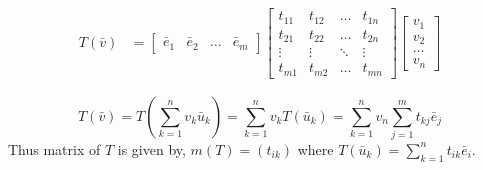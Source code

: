\begin{commentary}
\begin{align*}
	T(\bar{v}) & = \begin{bmatrix} \bar{e}_1 & \bar{e}_2 & \dots & \bar{e}_m \end{bmatrix} \begin{bmatrix} t_{11} & t_{12} & \dots & t_{1n} \\ t_{21} & t_{22} & \dots & t_{2n} \\ \vdots & \vdots & \ddots & \vdots \\ t_{m1} & t_{m2} & \dots & t_{mn} \end{bmatrix} \begin{bmatrix} v_1 \\ v_2 \\ \dots \\ v_n  \end{bmatrix} 
\end{align*}
\end{commentary}
\[ T(\bar{v}) = T \left( \sum_{k=1}^n v_k \bar{u}_k \right) = \sum_{k=1}^n v_k T(\bar{u}_k) = \sum_{k=1}^n v_n \sum_{j=1}^m t_{kj}\bar{e}_j \]
Thus matrix of $T$ is given by, $m(T) = (t_{ik})$ where $T(\bar{u}_k) = \sum_{k=1}^n t_{ik}\bar{e}_i$.
